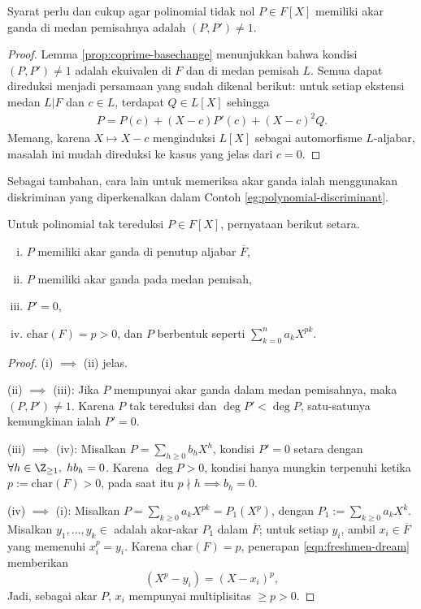 \begin{lemma}\label{prop:separable-polynomial-gen}
	Syarat perlu dan cukup agar polinomial tidak nol $P \in F[X]$ memiliki akar ganda di medan pemisahnya adalah $(P,P') \neq 1$.
\end{lemma}
\begin{proof}
	Lemma \ref{prop:coprime-basechange} menunjukkan bahwa kondisi $(P, P') \neq 1$ adalah ekuivalen di $F$ dan di medan pemisah $L$. Semua dapat direduksi menjadi persamaan yang sudah dikenal berikut: untuk setiap ekstensi medan $L|F$ dan $c \in L$, terdapat $Q \in L[X]$ sehingga
	\begin{gather}\label{eqn:derivation-linear-approx}
		P = P(c) + (X-c) P'(c) + (X-c)^2 Q.
	\end{gather}
	Memang, karena $X \mapsto X-c$ menginduksi $L[X]$ sebagai automorfisme $L$-aljabar, masalah ini mudah direduksi ke kasus yang jelas dari $c=0$.
\end{proof}
Sebagai tambahan, cara lain untuk memeriksa akar ganda ialah menggunakan diskriminan yang diperkenalkan dalam Contoh \ref{eg:polynomial-discriminant}.

\begin{theorem}\label{prop:separable-polynomial}
	Untuk polinomial tak tereduksi $P \in F[X]$, pernyataan berikut setara.
	\begin{enumerate}[(i)]
		\item $P$ memiliki akar ganda di penutup aljabar $\overline{F}$,
		\item $P$ memiliki akar ganda pada medan pemisah,
		\item $P'=0$,
		\item $\mathrm{char}(F)=p > 0$, dan $P$ berbentuk seperti $\sum_{k=0}^n a_k X^{pk}$.
	\end{enumerate}
\end{theorem}
\begin{proof}
	(i) $\implies$ (ii) jelas.

	(ii) $\implies$ (iii): Jika $P$ mempunyai akar ganda dalam medan pemisahnya, maka $(P,P') \neq 1$. Karena $P$ tak tereduksi dan $\deg P' < \deg P$, satu-satunya kemungkinan ialah $P'=0$.
	
	(iii) $\implies$ (iv): Misalkan $P = \sum_{h \geq 0} b_h X^h$, kondisi $P'=0$ setara dengan $\forall h \in \Z_{\geq 1},\; h b_h = 0$. Karena $\deg P > 0$, kondisi hanya mungkin terpenuhi ketika $p := \text{char}(F) > 0$, pada saat itu $p \nmid h \implies b_h = 0$. %
	
	(iv) $\implies$ (i): Misalkan $P = \sum_{k \geq 0} a_k X^{pk} = P_1(X^p)$, dengan $P_1 := \sum_{k \geq 0} a_k X^k$. Misalkan $y_1, \ldots, y_k \in $ adalah akar-akar $P_1$ dalam $\overline{F}$; untuk setiap $y_i$, ambil $x_i \in \overline{F}$ yang memenuhi $x_i^p = y_i$. Karena $\text{char}(F)=p$, penerapan \eqref{eqn:freshmen-dream} memberikan
	\[ (X^p-y_i) =  (X-x_i)^p, \]
	Jadi, sebagai akar $P$, $x_i$ mempunyai multiplisitas $\geq p > 0$.
\end{proof}

